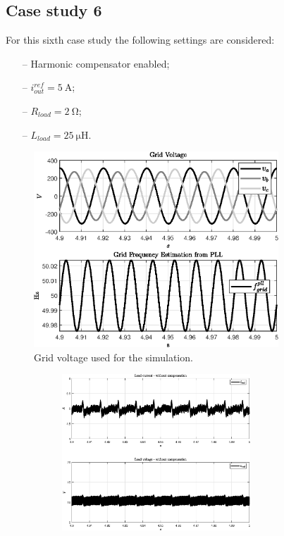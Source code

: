 \documentclass[11pt,a4paper,oneside]{book}
\numberwithin{equation}{section}
\theoremstyle{it}
\theoremstyle{definition}
\begin{document}
\begin{onehalfspace}
\section{Case study 6}
For this sixth case study the following settings are considered:
\begin{itemize}
	\item[--] Harmonic compensator enabled;
	\item[--] $i_{out}^{ref}=\SI{5}{\ampere}$;
	\item[--] $R_{load}=\SI{2}{\ohm}$;	
	\item[--] $L_{load}=\SI{25}{\micro\henry}$.
\end{itemize}
\begin{figure}[H]
	\centering
	\includegraphics[width = 260pt, angle = 0, 
	keepaspectratio]{figures/sr_with_full_load_3/with_comp_fig_2.eps}
	\captionsetup{width=0.5\textwidth, font=small}	
	\caption{Grid voltage used for the simulation.}
	\label{}
\end{figure}
\begin{figure}[H]
	\centering
	\begin{subfigure}{0.5\textwidth}
		\centering
		\includegraphics[width = 200pt, angle = 0, 
		keepaspectratio]{figures/sr_with_full_load_3/with_comp_fig_4.eps}
		\captionsetup{width=0.65\textwidth, font=footnotesize}	

\end{subfigure}
\end{figure}
\end{onehalfspace}
\end{document}
